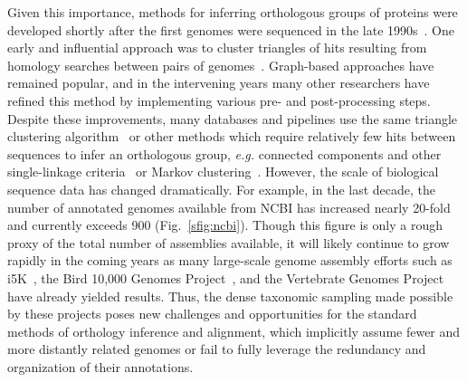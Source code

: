 Given this importance, methods for inferring orthologous groups of proteins were developed shortly after the first genomes were sequenced in the late 1990s~\cite{Fleischmann1995, Goffeau1996, CESC1998}. One early and influential approach was to cluster triangles of hits resulting from homology searches between pairs of genomes~\cite{Tatusov1997}. Graph-based approaches have remained popular, and in the intervening years many other researchers have refined this method by implementing various pre- and post-processing steps. Despite these improvements, many databases and pipelines use the same triangle clustering algorithm~\cite{Jensen2007} or other methods which require relatively few hits between sequences to infer an orthologous group, \textit{e.g.} connected components and other single-linkage criteria~\cite{Remm2001, Train2017, Linard2011, Cosentino2018} or Markov clustering~\cite{Enright2002, Li2003, Emms2015}. However, the scale of biological sequence data has changed dramatically. For example, in the last decade, the number of annotated genomes available from NCBI has increased nearly 20-fold and currently exceeds 900 (Fig.~\ref{sfig:ncbi}). Though this figure is only a rough proxy of the total number of assemblies available, it will likely continue to grow rapidly in the coming years as many large-scale genome assembly efforts such as i5K~\cite{Thomas2020}, the Bird 10,000 Genomes Project~\cite{Feng2020}, and the Vertebrate Genomes Project~\cite{Rhie2021} have already yielded results. Thus, the dense taxonomic sampling made possible by these projects poses new challenges and opportunities for the standard methods of orthology inference and alignment, which implicitly assume fewer and more distantly related genomes or fail to fully leverage the redundancy and organization of their annotations.

